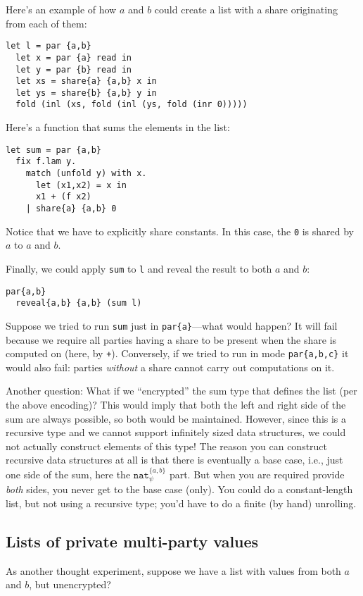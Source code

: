 \documentclass[10pt]{article}
\newcommand{\tnat}{\ensuremath{\mathtt{nat}}}
\begin{document}
Here's an example of how $a$ and $b$ could create a list with a share
originating from each of them:
\begin{verbatim}
let l = par {a,b}
  let x = par {a} read in
  let y = par {b} read in
  let xs = share{a} {a,b} x in
  let ys = share{b} {a,b} y in
  fold (inl (xs, fold (inl (ys, fold (inr 0)))))
\end{verbatim}
Here's a function that sums the elements in the list:
\begin{verbatim}
let sum = par {a,b}
  fix f.lam y.
    match (unfold y) with x.
      let (x1,x2) = x in
      x1 + (f x2)
    | share{a} {a,b} 0
\end{verbatim}
Notice that we have to explicitly share constants. In this case, the
\verb+0+ is shared by $a$ to $a$ and $b$.

Finally, we could apply \verb+sum+ to \verb+l+ and reveal the result
to both $a$ and $b$:
\begin{verbatim}
par{a,b}
  reveal{a,b} {a,b} (sum l)
\end{verbatim}

Suppose we tried to run \verb+sum+ just in \verb+par{a}+---what would
happen? It will fail because we require all parties having a share to
be present when the share is computed on (here, by
\verb!+!). Conversely, if we tried to run in mode \verb+par{a,b,c}+ it
would also fail: parties \emph{without} a share cannot carry out
computations on it.

Another question: What if we ``encrypted'' the sum type that defines
the list (per the above encoding)? This would imply that both the left
and right side of the sum are always possible, so both would be
maintained. However, since this is a recursive type and we cannot
support infinitely sized data structures, we could not actually
construct elements of this type! The reason you can construct
recursive data structures at all is that there is eventually a base
case, i.e., just one side of the sum, here the $\tnat^{\{a,b\}}_\psi$
part. But when you are required provide \emph{both} sides, you never
get to the base case (only). You could do a constant-length list, but
not using a recursive type; you'd have to do a finite (by hand)
unrolling.

\subsection{Lists of private multi-party values}

As another thought experiment, suppose we have a list with values from
both $a$ and $b$, but unencrypted?
\end{document}
